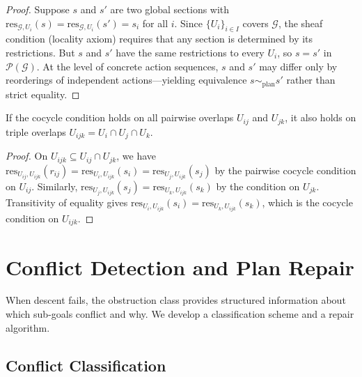 \documentclass[11pt]{article}
\newcommand{\PlanSheaf}{\mathcal{P}}
\newcommand{\SubGoal}[1]{U_{#1}}
\newcommand{\GoalSpace}{\mathcal{G}}
\newcommand{\CoverFam}{\{U_i\}_{i \in I}}
\newcommand{\PlanRes}{\mathrm{res}}
\newcommand{\PlanEquiv}{\sim_{\mathrm{plan}}}
\begin{document}
\begin{proof}
  Suppose $s$ and $s'$ are two global sections with
  $\PlanRes_{\GoalSpace, \SubGoal{i}}(s) =
  \PlanRes_{\GoalSpace, \SubGoal{i}}(s') = s_i$ for all $i$.
  Since $\CoverFam$ covers $\GoalSpace$, the sheaf condition
  (locality axiom) requires that any section is determined by
  its restrictions.  But $s$ and $s'$ have the same restrictions
  to every $\SubGoal{i}$, so $s = s'$ in $\PlanSheaf(\GoalSpace)$.
  At the level of concrete action sequences, $s$ and $s'$ may
  differ only by reorderings of independent actions---yielding
  equivalence $s \PlanEquiv s'$ rather than strict equality.
\end{proof}

\begin{proposition}\label{prop:cocycle-trans}
  If the cocycle condition holds on all pairwise overlaps
  $\SubGoal{ij}$ and $\SubGoal{jk}$, it also holds on triple
  overlaps $\SubGoal{ijk} = \SubGoal{i} \cap \SubGoal{j} \cap \SubGoal{k}$.
\end{proposition}

\begin{proof}
  On $\SubGoal{ijk} \subseteq \SubGoal{ij} \cap \SubGoal{jk}$,
  we have $\PlanRes_{\SubGoal{ij}, \SubGoal{ijk}}(r_{ij}) =
  \PlanRes_{\SubGoal{i}, \SubGoal{ijk}}(s_i) =
  \PlanRes_{\SubGoal{j}, \SubGoal{ijk}}(s_j)$ by the pairwise
  cocycle condition on $\SubGoal{ij}$.  Similarly,
  $\PlanRes_{\SubGoal{j}, \SubGoal{ijk}}(s_j) =
  \PlanRes_{\SubGoal{k}, \SubGoal{ijk}}(s_k)$ by the condition
  on $\SubGoal{jk}$.  Transitivity of equality gives
  $\PlanRes_{\SubGoal{i}, \SubGoal{ijk}}(s_i) =
  \PlanRes_{\SubGoal{k}, \SubGoal{ijk}}(s_k)$, which is the
  cocycle condition on $\SubGoal{ijk}$.
\end{proof}


\section{Conflict Detection and Plan Repair}\label{sec:conflict}

When descent fails, the obstruction class provides structured
information about which sub-goals conflict and why.  We develop
a classification scheme and a repair algorithm.

\subsection{Conflict Classification}\label{ssec:classification}
\end{document}
